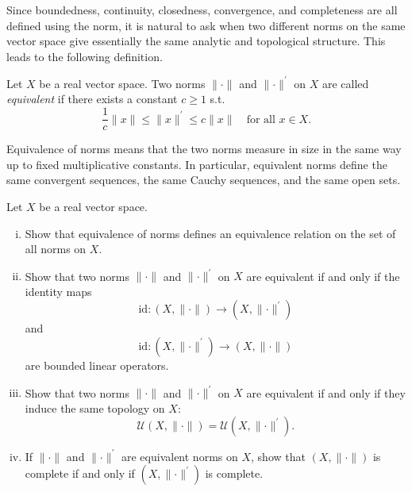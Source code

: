 Since boundedness, continuity, closedness, convergence, and completeness are all defined using the norm, it is natural to ask when two different norms on the same vector space give essentially the same analytic and topological structure. This leads to the following definition.

\begin{definition}
    Let \(X\) be a real vector space. Two norms \(\lVert \cdot \rVert \) and \(\lVert \cdot \rVert^{\prime}  \) on \(X\) are called \emph{equivalent} if there exists a constant \(c \ge 1\) s.t. 
    \[
        \frac{1}{c} \lVert x \rVert \le \lVert x \rVert^{\prime} \le c \lVert x \rVert \quad \text{for all } x \in X.    
    \]     
\end{definition}

\begin{remark}
    Equivalence of norms means that the two norms measure in size in the same way up to fixed multiplicative constants. In particular, equivalent norms define the same convergent sequences, the same Cauchy sequences, and the same open sets.
\end{remark}

\begin{exercise}
    Let \(X\) be a real vector space. 
    \begin{enumerate}[(i)]
        \item Show that equivalence of norms defines an equivalence relation on the set of all norms on \(X\). 
        \item Show that two norms \(\lVert \cdot \rVert \) and \(\lVert \cdot \rVert^{\prime}  \) on \(X\) are equivalent if and only if the identity maps 
        \[
            \mathrm{id}: (X, \lVert \cdot \rVert ) \to (X, \lVert \cdot \rVert^{\prime} )
        \]
        and 
        \[
           \mathrm{id}: (X, \lVert \cdot \rVert^{\prime} ) \to (X, \lVert \cdot \rVert ) 
        \]
        are bounded linear operators. 
        \item Show that two norms \(\lVert \cdot \rVert \) and \(\lVert \cdot \rVert^{\prime}  \) on \(X\) are equivalent if and only if they induce the same topology on \(X\): 
        \[
            \mathcal{U} (X, \lVert \cdot \rVert ) = \mathcal{U} (X, \lVert \cdot \rVert^{\prime}  ).
        \]
        \item If \(\lVert \cdot \rVert \) and \(\lVert \cdot \rVert^{\prime}  \) are equivalent norms on \(X\), show that \((X, \lVert \cdot \rVert )\) is complete if and only if \((X, \lVert \cdot \rVert^{\prime})\) is complete.    
    \end{enumerate} 
\end{exercise}

